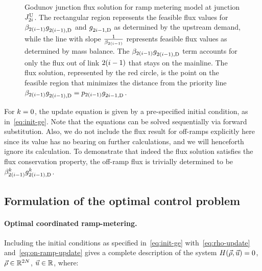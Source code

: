 \begin{figure}
								\caption{Godunov junction flux solution for ramp metering model at junction
									$J_{2i}^{\text{U}}$. The rectangular region represents the feasible flux
									values for $\splitratio_{2\left(\link-1\right)}\fout{2\left(\link-1\right)}{}$
									and $g_{2i-1,\text{D}}^{}$ as determined by the upstream demand, while
									the line with slope\label{fig:Godunov-junction-flux} $\frac{1}{\splitratio_{2\left(\link-1\right)}}$
									represents feasible flux values as determined by mass balance. The
									$\splitratio_{2\left(\link-1\right)}\fout{2\left(\link-1\right)}{}$
									term accounts for only the flux out of link $2\left(\link-1\right)$
									that stays on the mainline. The flux solution, represented by the
									red circle, is the point on the feasible region that minimizes the
									distance from the priority line $\splitratio_{2\left(\link-1\right)}\fout{2\left(\link-1\right)}{}=p_{2(\link-1)}\fout{2\link-1}{}$.}
							\end{figure}
														
														
							For $k=0$, the update equation is given by a pre-specified initial
							condition, as in~\eqref{eq:init-ge}. Note that the equations can
							be solved sequentially via forward substitution. Also, we do not include
							the flux result for off-ramps explicitly here since its value has no
							bearing on further calculations, and we will henceforth ignore its
							calculation. To demonstrate that indeed the flux solution satisfies
							the flux conservation property, the off-ramp flux is trivially determined
							to be $\splitratio_{2\left(\link-1\right)}^{\tind}\fout{2\left(\link-1\right)}{\tind}$.
														
														
							\subsection{Formulation of the optimal control problem}
														
														
							\paragraph{Optimal coordinated ramp-metering.}
														
							Including the initial conditions as specified in~\eqref{eq:init-ge}
							with~\eqref{eq:rho-update} and~\eqref{eq:on-ramp-update} gives
							a complete description of the system $\sys\left(\state,\control\right)=0$,
							$\vec{\rho}\in\mathbb{R}^{2N}$, $\vec{u}\in\mathbb{R}$, where:
														
